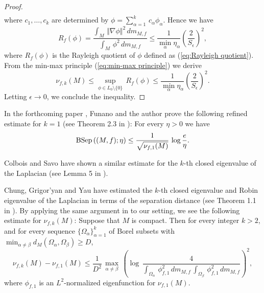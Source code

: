 \begin{proof}
\begin{align*}
\end{align*}
where $c_{1},\dots,c_{k}$ are determined by $\phi=\sum^{k}_{\alpha=1}\,c_{\alpha} \phi_{\alpha}$.
Hence
we have
\begin{equation*}
R_{f}(\phi)=\frac{\int_{M} \,\Vert \nabla \phi \Vert^{2} \,dm_{M,f}}{\int_{M} \,\phi^{2} \,dm_{M,f}} \leq \frac{1}{\min_{\alpha} \eta_{\alpha}}\left(\frac{2}{S_{\epsilon}}\right)^{2},
\end{equation*}
where $R_{f}(\phi)$ is the Rayleigh quotient of $\phi$ defined as (\ref{eq:Rayleigh quotient}).
From the min-max principle (\ref{eq:min-max principle})
we derive
\begin{equation*}
\nu_{f,k}(M) \leq \sup_{\phi \in L_{0}\setminus \{0\}}\,R_{f}(\phi) \leq \frac{1}{\min_{\alpha} \eta_{\alpha}}\left(\frac{2}{S_{\epsilon}}\right)^{2}.
\end{equation*}
Letting $\epsilon \to 0$,
we conclude the inequality.
\end{proof}

\begin{rem}
In the forthcoming paper \cite{FSa},
Funano and the author prove the following refined estimate for $k=1$ (see Theorem 2.3 in \cite{FSa}):
For every $\eta>0$
we have
\begin{equation*}
\operatorname{BSep}\left((M,f);\eta\right)\leq \frac{1}{\sqrt{\nu_{f,1}(M)}} \,\log \frac{e}{\eta}.
\end{equation*}
\end{rem}

\begin{rem}
Colbois and Savo \cite{CS} have shown a similar estimate for the $k$-th closed eigenvalue of the Laplacian (see Lemma 5 in \cite{CS}). 
\end{rem}

\begin{rem}
Chung, Grigor'yan and Yau \cite{CGY} have estimated the $k$-th closed eigenvalue and Robin eigenvalue of the Laplacian in terms of the separation distance (see Theorem 1.1 in \cite{CGY}).
By applying the same argument in \cite{CGY} to our setting,
we see the following estimate for $\nu_{f,k}(M)$:
Suppose that $M$ is compact.
Then for every integer $k>2$,
and for every sequence $\{\Omega_{\alpha}\}^{k}_{\alpha=1}$ of Borel subsets with $\min_{\alpha \neq \beta} d_{M}(\Omega_{\alpha},\Omega_{\beta})\geq D$,
\begin{equation*}
\nu_{f,k}(M)-\nu_{f,1}(M) \leq \frac{1}{D^{2}}\,\max_{\alpha \neq \beta} \,\left( \log\,\frac{4}{\int_{\Omega_{\alpha}} \,\phi^{2}_{f,1}\,dm_{M,f} \, \int_{\Omega_{\beta}} \,\phi^{2}_{f,1}\,dm_{M,f}   }  \right)^{2},
\end{equation*}
where $\phi_{f,1}$ is an $L^{2}$-normalized eigenfunction for $\nu_{f,1}(M)$.
\end{rem}

